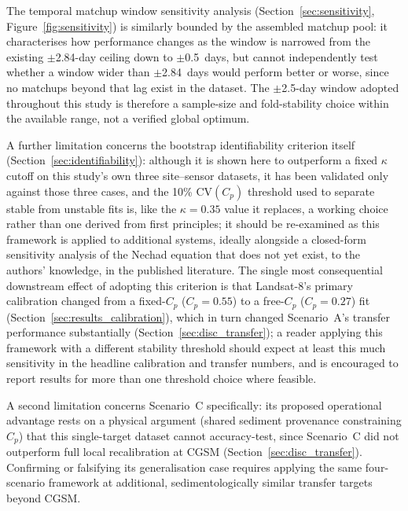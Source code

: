 \documentclass[remotesensing,article,submit,pdftex,moreauthors]{Definitions/mdpi}
\begin{document}
The temporal matchup window sensitivity analysis
(Section~\ref{sec:sensitivity}, Figure~\ref{fig:sensitivity}) is
similarly bounded by the assembled matchup pool: it characterises how
performance changes as the window is narrowed from the existing
$\pm$2.84-day ceiling down to $\pm$0.5~days, but cannot independently
test whether a window wider than $\pm$2.84~days would perform better
or worse, since no matchups beyond that lag exist in the dataset. The
$\pm$2.5-day window adopted throughout this study is therefore a
sample-size and fold-stability choice within the available range,
not a verified global optimum.

A further limitation concerns the bootstrap identifiability criterion
itself (Section~\ref{sec:identifiability}): although it is shown here
to outperform a fixed $\kappa$ cutoff on this study's own three
site--sensor datasets, it has been validated only against those three
cases, and the 10\% $\mathrm{CV}(C_p)$ threshold used to separate
stable from unstable fits is, like the $\kappa = 0.35$ value it
replaces, a working choice rather than one derived from first
principles; it should be re-examined as this framework is applied to
additional systems, ideally alongside a closed-form sensitivity
analysis of the Nechad equation that does not yet exist, to the
authors' knowledge, in the published literature. The single most
consequential downstream effect of adopting this criterion is that
Landsat-8's primary calibration changed from a fixed-$C_p$
($C_p=0.55$) to a free-$C_p$ ($C_p=0.27$) fit
(Section~\ref{sec:results_calibration}), which in turn changed
Scenario~A's transfer performance substantially
(Section~\ref{sec:disc_transfer}); a reader applying this framework
with a different stability threshold should expect at least this much
sensitivity in the headline calibration and transfer numbers, and is
encouraged to report results for more than one threshold choice where
feasible.

A second limitation concerns Scenario~C specifically: its proposed
operational advantage rests on a physical argument (shared sediment
provenance constraining $C_p$) that this single-target dataset cannot
accuracy-test, since Scenario~C did not outperform full local
recalibration at CGSM (Section~\ref{sec:disc_transfer}). Confirming or
falsifying its generalisation case requires applying the same four-
scenario framework at additional, sedimentologically similar transfer
targets beyond CGSM.
\end{document}
